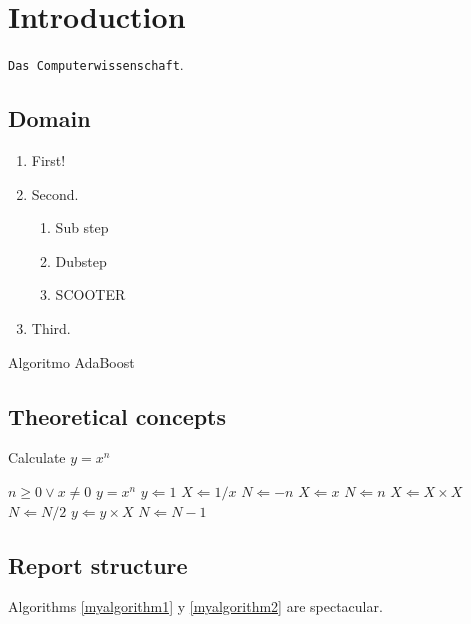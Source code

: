 \chapter{Introduction}

\texttt{Das Computerwissenschaft}.

\section{Domain}

\begin{algorithm}[H]
 \begin{enumerate}
 \item First!
 \item Second.
    \begin{enumerate}
        \item Sub step
        \item Dubstep
        \item SCOOTER
    \end{enumerate}
 \item Third.
 \end{enumerate}
 \caption{Algoritmo AdaBoost}
 \label{myalgorithm}
\end{algorithm}

\section{Theoretical concepts}

\begin{algorithm}                      %
\caption{Calculate $y = x^n$}          %
\label{myalgorithm2}                           %
\begin{algorithmic}                    %
    \Require $n \geq 0 \vee x \neq 0$
    \Ensure $y = x^n$
    \State $y \Leftarrow 1$
        \State $X \Leftarrow 1 / x$
        \State $N \Leftarrow -n$
    \Else
        \State $X \Leftarrow x$
        \State $N \Leftarrow n$
    \EndIf
            \State $X \Leftarrow X \times X$
            \State $N \Leftarrow N / 2$
        \Else[$N$ is odd]
            \State $y \Leftarrow y \times X$
            \State $N \Leftarrow N - 1$
        \EndIf
    \EndWhile
\end{algorithmic}
\end{algorithm}

\section{Report structure}

Algorithms \ref{myalgorithm1} y \ref{myalgorithm2} are spectacular.
